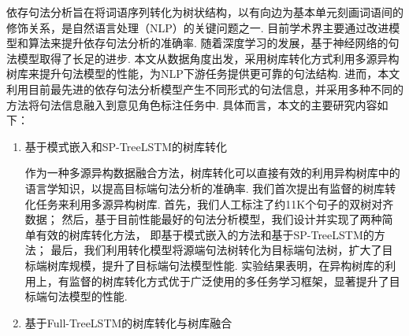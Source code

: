 
\begin{cabstract}

    依存句法分析旨在将词语序列转化为树状结构，以有向边为基本单元刻画词语间的修饰关系，是自然语言处理（NLP）的关键问题之一.
    目前学术界主要通过改进模型和算法来提升依存句法分析的准确率. 随着深度学习的发展，基于神经网络的句法模型取得了长足的进步. 本文从数据角度出发，采用树库转化方式利用多源异构树库来提升句法模型的性能，为NLP下游任务提供更可靠的句法结构.
    进而，本文利用目前最先进的依存句法分析模型产生不同形式的句法信息，并采用多种不同的方法将句法信息融入到意见角色标注任务中. 具体而言，本文的主要研究内容如下：



    \begin{enumerate}
        \item 基于模式嵌入和SP-TreeLSTM的树库转化

              作为一种多源异构数据融合方法，树库转化可以直接有效的利用异构树库中的语言学知识，以提高目标端句法分析的准确率.
              我们首次提出有监督的树库转化任务来利用多源异构树库. %
              首先，我们人工标注了约11K个句子的双树对齐数据；
              然后，基于目前性能最好的句法分析模型，我们设计并实现了两种简单有效的树库转化方法，
              即基于模式嵌入的方法和基于SP-TreeLSTM的方法；
              最后，我们利用转化模型将源端句法树转化为目标端句法树，扩大了目标端树库规模，提升了目标端句法模型性能.
              实验结果表明，在异构树库的利用上，有监督的树库转化方式优于广泛使用的多任务学习框架，显著提升了目标端句法模型的性能.

        \item 基于Full-TreeLSTM的树库转化与树库融合


\end{enumerate}
\end{cabstract}
